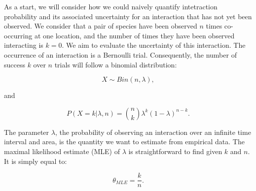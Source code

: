 ﻿\documentclass[12pt]{article}
\begin{document}
  As a start, we will consider how we could naively quantify intetraction probability and its associated uncertainty for an interaction that has not yet been observed. We consider that a pair of species have been observed $n$ times co-occurring at one location, and the number of times they have been observed interacting is $k = 0$. We aim to evaluate the uncertainty of this interaction. The occurrence of an interaction is a Bernoulli trial. Consequently, the number of success $k$ over $n$ trials will follow a binomial distribution: 
      
      \begin{equation}
        X \sim Bin(n,\lambda) ,
      \end{equation}

      \noindent and 

      \begin{equation}
         P(X = k|\lambda,n) = {n \choose k}\lambda^k(1-\lambda)^{n-k} . 
         \label{likelihood}
      \end{equation}

  \noindent The parameter $\lambda$, the probability of observing an interaction over an infinite time interval and area, is the quantity we want to estimate from empirical data. 
  The maximal likelihood estimate (MLE) of $\lambda$ is straightforward to find given $k$ and $n$. It is simply equal to:

      \begin{equation}
        \theta_{MLE} = \frac{k}{n}  .
        \label{theta_MLE}
      \end{equation}
\end{document}
